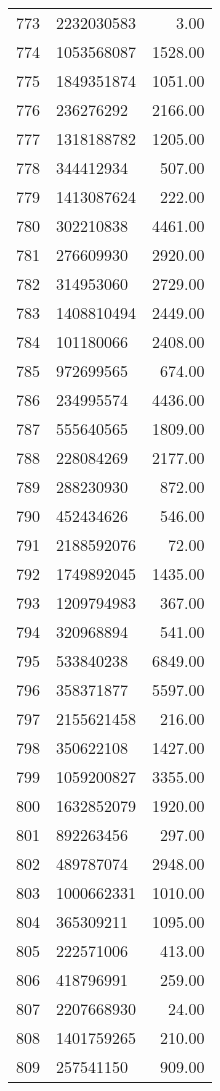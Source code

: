 \begin{table}[ht]
\begin{tabular}{rlr}
  773 & 2232030583 & 3.00 \\ 
  774 & 1053568087 & 1528.00 \\ 
  775 & 1849351874 & 1051.00 \\ 
  776 & 236276292 & 2166.00 \\ 
  777 & 1318188782 & 1205.00 \\ 
  778 & 344412934 & 507.00 \\ 
  779 & 1413087624 & 222.00 \\ 
  780 & 302210838 & 4461.00 \\ 
  781 & 276609930 & 2920.00 \\ 
  782 & 314953060 & 2729.00 \\ 
  783 & 1408810494 & 2449.00 \\ 
  784 & 101180066 & 2408.00 \\ 
  785 & 972699565 & 674.00 \\ 
  786 & 234995574 & 4436.00 \\ 
  787 & 555640565 & 1809.00 \\ 
  788 & 228084269 & 2177.00 \\ 
  789 & 288230930 & 872.00 \\ 
  790 & 452434626 & 546.00 \\ 
  791 & 2188592076 & 72.00 \\ 
  792 & 1749892045 & 1435.00 \\ 
  793 & 1209794983 & 367.00 \\ 
  794 & 320968894 & 541.00 \\ 
  795 & 533840238 & 6849.00 \\ 
  796 & 358371877 & 5597.00 \\ 
  797 & 2155621458 & 216.00 \\ 
  798 & 350622108 & 1427.00 \\ 
  799 & 1059200827 & 3355.00 \\ 
  800 & 1632852079 & 1920.00 \\ 
  801 & 892263456 & 297.00 \\ 
  802 & 489787074 & 2948.00 \\ 
  803 & 1000662331 & 1010.00 \\ 
  804 & 365309211 & 1095.00 \\ 
  805 & 222571006 & 413.00 \\ 
  806 & 418796991 & 259.00 \\ 
  807 & 2207668930 & 24.00 \\ 
  808 & 1401759265 & 210.00 \\ 
  809 & 257541150 & 909.00 \\ 

\end{tabular}
\end{table}
